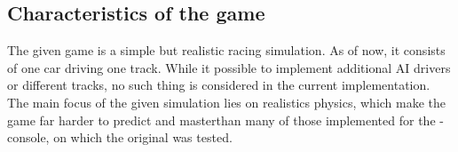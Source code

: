 %
%


\subsection{Characteristics of the game}



The given game is a simple but realistic racing simulation. As of now, it consists of one car driving one track. While it possible to implement additional AI drivers or different tracks, no such thing is considered in the current implementation. The main focus of the given simulation lies on realistics physics, which make the game far harder to predict and masterthan many of those implemented for the -console, on which the original  was tested.

